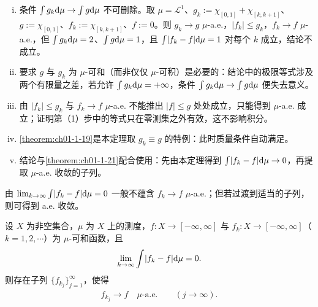 \documentclass[../../main.tex]{subfiles}%
\begin{document}
\begin{remark}\label{remark:ch01-thm-1-20-条件}
\begin{enumerate}[(i)]
\item 条件 $\int g_k\mathrm{d}\mu\to\int g\mathrm{d}\mu$ 不可删除。取 $\mu=\mathcal{L}^1$、$g_k:=\chi_{[0,1]}+\chi_{[k,k+1]}$、$g:=\chi_{[0,1]}$、$f_k:=\chi_{[k,k+1]}$、$f:=0$。则 $g_k\to g$ $\mu$-a.e.，$\lvert f_k\rvert\leqslant g_k$，$f_k\to f$ $\mu$-a.e.，但 $\int g_k\mathrm{d}\mu=2$、$\int g\mathrm{d}\mu=1$，且 $\int\lvert f_k-f\rvert\mathrm{d}\mu=1$ 对每个 $k$ 成立，结论不成立。
\item 要求 $g$ 与 $g_k$ 为 $\mu$-可和（而非仅仅 $\mu$-可积）是必要的：结论中的极限等式涉及两个有限量之差，若允许 $\int g_k\mathrm{d}\mu=+\infty$，条件 $\int g_k\mathrm{d}\mu\to\int g\mathrm{d}\mu$ 便失去意义。
\item 由 $\lvert f_k\rvert\leqslant g_k$ 与 $f_k\to f$ $\mu$-a.e. 不能推出 $\lvert f\rvert\leqslant g$ 处处成立，只能得到 $\mu$-a.e. 成立；证明第（1）步中的等式只在零测集之外有效，这不影响积分。
\item \cref{theorem:ch01-1-19}是本定理取 $g_k\equiv g$ 的特例：此时质量条件自动满足。%
\item 结论与\cref{theorem:ch01-1-21}配合使用：先由本定理得到 $\int\lvert f_k-f\rvert\mathrm{d}\mu\to0$，再提取 $\mu$-a.e. 收敛的子列。%
\end{enumerate}
\end{remark}

由 $\lim_{k\to\infty}\int\lvert f_k-f\rvert\mathrm{d}\mu=0$ 一般不蕴含 $f_k\to f$ $\mu$-a.e.；但若过渡到适当的子列，则可得到 a.e. 收敛。

\begin{theorem}[几乎处处收敛的子列]\label{theorem:ch01-1-21}
设 $X$ 为非空集合，$\mu$ 为 $X$ 上的测度，$f:X\to[-\infty,\infty]$ 与 $f_k:X\to[-\infty,\infty]$（$k=1,2,\cdots$）为 $\mu$-可和函数，且
\begin{align*}
\lim_{k\to\infty}\int\lvert f_k-f\rvert\mathrm{d}\mu=0 .
\end{align*}
则存在子列 $\{f_{k_j}\}_{j=1}^{\infty}$，使得
\begin{align*}
f_{k_j}\to f\quad\mu\text{-a.e.}\qquad(j\to\infty).
\end{align*}
\end{theorem}
\end{document}
